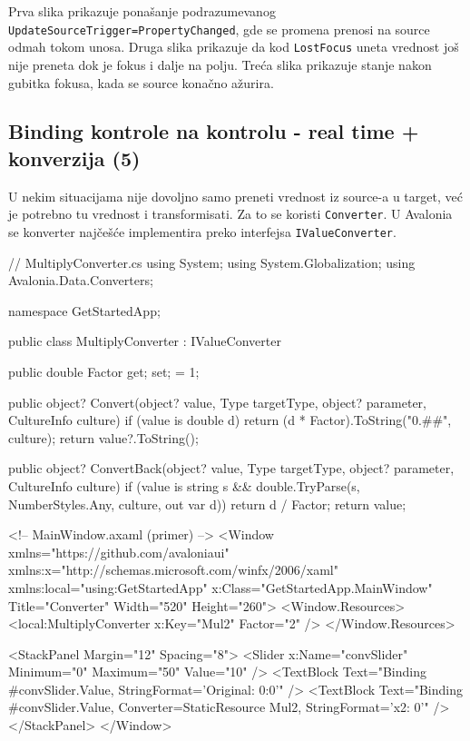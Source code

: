 \documentclass[11pt,a4paper]{article}
\begin{document}
Prva slika prikazuje ponašanje podrazumevanog \texttt{UpdateSourceTrigger=PropertyChanged}, gde se promena prenosi na source odmah tokom unosa. Druga slika prikazuje da kod \texttt{LostFocus} uneta vrednost još nije preneta dok je fokus i dalje na polju. Treća slika prikazuje stanje nakon gubitka fokusa, kada se source konačno ažurira.

\subsection{Binding kontrole na kontrolu - real time + konverzija (5)}
U nekim situacijama nije dovoljno samo preneti vrednost iz source-a u target, već je potrebno tu vrednost i transformisati. Za to se koristi \texttt{Converter}. U Avalonia se konverter najčešće implementira preko interfejsa \texttt{IValueConverter}.

\begin{CodeBlock}
// MultiplyConverter.cs
using System;
using System.Globalization;
using Avalonia.Data.Converters;

namespace GetStartedApp;

public class MultiplyConverter : IValueConverter
{
    public double Factor { get; set; } = 1;

    public object? Convert(object? value, Type targetType, object? parameter, CultureInfo culture)
    {
        if (value is double d)
            return (d * Factor).ToString("0.##", culture);
        return value?.ToString();
    }

    public object? ConvertBack(object? value, Type targetType, object? parameter, CultureInfo culture)
    {
        if (value is string s && double.TryParse(s, NumberStyles.Any, culture, out var d))
            return d / Factor;
        return value;
    }
}
\end{CodeBlock}

\begin{CodeBlock}
<!-- MainWindow.axaml (primer) -->
<Window xmlns="https://github.com/avaloniaui"
        xmlns:x="http://schemas.microsoft.com/winfx/2006/xaml"
        xmlns:local="using:GetStartedApp"
        x:Class="GetStartedApp.MainWindow"
        Title="Converter" Width="520" Height="260">
  <Window.Resources>
    <local:MultiplyConverter x:Key="Mul2" Factor="2" />
  </Window.Resources>

  <StackPanel Margin="12" Spacing="8">
    <Slider x:Name="convSlider" Minimum="0" Maximum="50" Value="10" />
    <TextBlock Text="{Binding #convSlider.Value, StringFormat='Original: {0:0}'}" />
    <TextBlock Text="{Binding #convSlider.Value, Converter={StaticResource Mul2}, StringFormat='x2: {0}'}" />
  </StackPanel>
</Window>
\end{CodeBlock}
\end{document}
